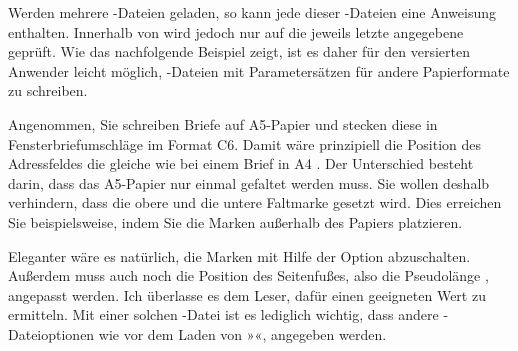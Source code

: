 Werden \iffalse nacheinander \fi %
mehrere -Dateien geladen, so kann jede dieser
-Dateien eine Anweisung 
enthalten. Innerhalb von  wird
jedoch nur auf die jeweils letzte angegebene  geprüft. Wie
das nachfolgende Beispiel zeigt, ist es daher für den versierten Anwender
leicht möglich, -Dateien mit Parametersätzen für andere
Papierformate zu schreiben. %
\iffalse%
Wer allerdings nicht vor hat, selbst solche \File{lco}-Dateien zu schreiben,
der kann die Erklärung zu dieser Anweisung gleich wieder vergessen und auch
das Beispiel überspringen.%
\fi
\begin{Example}
  \iffalse%
  Nehmen wir einmal an, dass Sie A5-Papier in normaler Ausrichtung, also
  hochkant oder portrait, für Ihre Briefe verwenden. Nehmen wir weiter an,
  dass Sie diese in normale Fensterbriefumschläge im Format C6 stecken. %
  \else%
  Angenommen, Sie schreiben Briefe auf A5-Papier und stecken diese in
  Fensterbriefumschläge im Format C6. %
  \fi%
  Damit wäre prinzipiell die Position des Adressfeldes die gleiche wie bei
  einem %
  \iffalse normalen Brief in A4 nach DIN\else Brief in A4\fi %
  . Der Unterschied besteht \iffalse im Wesentlichen \fi%
  darin, dass das A5-Papier nur einmal gefaltet werden muss. Sie wollen
  deshalb verhindern, dass die obere und die untere Faltmarke gesetzt
  wird. Dies erreichen Sie beispielsweise, indem Sie die Marken außerhalb des
  Papiers platzieren.
  Eleganter wäre es natürlich, die Marken mit Hilfe der Option
   abzuschalten.  Außerdem muss auch noch
  die Position des Seitenfußes, also die Pseudolänge
  ,
  angepasst werden. Ich überlasse es dem Leser, dafür einen geeigneten Wert zu
  ermitteln. Mit einer solchen -Datei ist es lediglich wichtig, dass
  andere -Dateioptionen wie  vor dem Laden von
  »«, angegeben werden.
\end{Example}
%
\EndIndexGroup%
\EndIndexGroup%
\ExampleEndFix


